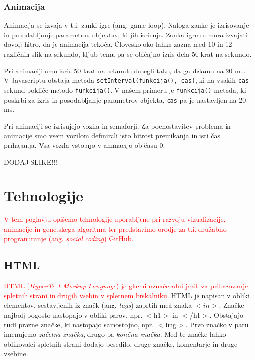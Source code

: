 \documentclass[a4paper, 12pt]{book}
\begin{document}
\subsection{Animacija}
Animacija se izvaja v t.i. zanki igre (ang. game loop). Naloga zanke je izrisovanje in posodabljanje parametrov objektov, ki jih izrisuje. Zanka igre se mora izvajati dovolj hitro, da je animacija teko\v ca. \v Clovesko oko lahko zazna med 10 in 12 razli\v cnih slik na sekundo, kljub temu pa se obi\v cajno izris dela 50-krat na sekundo.

Pri animaciji smo izris 50-krat na sekundo dosegli tako, da ga delamo na 20 ms. V Javascriptu obstaja metoda \verb+setInterval(funkcija(), cas)+, ki na vsakih \verb+cas+ sekund pokli\v ce metodo \verb+funkcija()+. V na\v sem primeru je \verb+funkcija()+ metoda, ki poskrbi za izris in posodabljanje parametrov objekta, \verb+cas+ pa je nastavljen na 20 ms.

Pri animaciji se izrisujejo vozila in semaforji.  Za poenostavitev problema in  animacije smo vsem vozilom definirali isto hitrost premikanja in isti \v cas prihajanja. Vsa vozila vstopijo v animacijo ob \v casu 0.

\begin{center}
DODAJ SLIKE!!!
\end{center}

\chapter{Tehnologije}
\label{ch3}
\textcolor{red}{V tem poglavju opi\v semo tehnologije uporabljene pri razvoju vizualizacije, animacije in genetskega algoritma ter predstavimo orodje za t.i. dru\v zabno programiranje (ang. \textit{social coding}) GitHub.}

\section{HTML}

\textcolor{red}{HTML (\textit{HyperText Markup Language}) je glavni ozna\v cevalni jezik za prikazovanje spletnih strani in drugih vsebin v spletnem brskalniku.}
HTML je napisan v obliki elementov, sestavljenih iz zna\v ck (ang. \textit{tags}) zaprtih med znaka $< in >$. Zna\v cke najbolj pogosto nastopajo v obliki parov, npr. $<$h1$>$ in $<$/h1$>$. Obstajajo tudi prazne zna\v cke, ki nastopajo samostojno, npr. $<$img$>$. Prvo zna\v cko v paru imenujemo \textit{za\v cetna zna\v cka}, drugo pa \textit{kon\v cna zna\v cka}. Med te zna\v cke lahko oblikovalci spletnih strani dodajo besedilo, druge zna\v cke, komentarje in druge vsebine.
\end{document}
